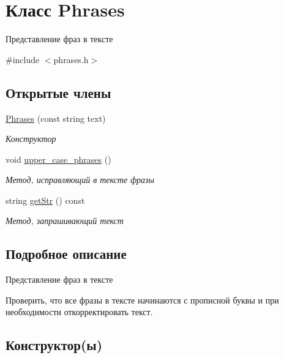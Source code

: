 \hypertarget{classPhrases}{}\section{Класс Phrases}
\label{classPhrases}


Представление фраз в тексте  




{\ttfamily \#include $<$phrases.\+h$>$}

\subsection*{Открытые члены}
\begin{DoxyCompactItemize}
\item 
\hyperlink{classPhrases_af87c3bec3733612dfb6afcef83495ccb}{Phrases} (const string text)
\begin{DoxyCompactList}\small\item\em Конструктор \end{DoxyCompactList}\item 
void \hyperlink{classPhrases_ad870102ac0cc2e26435e0000592cb6f9}{upper\+\_\+case\+\_\+phrases} ()
\begin{DoxyCompactList}\small\item\em Метод, исправляющий в тексте фразы \end{DoxyCompactList}\item 
string \hyperlink{classPhrases_a81f88cdd9e53a8591565a0fdb1890927}{get\+Str} () const 
\begin{DoxyCompactList}\small\item\em Метод, запрашивающий текст \end{DoxyCompactList}\end{DoxyCompactItemize}


\subsection{Подробное описание}
Представление фраз в тексте 

Проверить, что все фразы в тексте начинаются с прописной буквы и при необходимости откорректировать текст. 

\subsection{Конструктор(ы)}
\hypertarget{classPhrases_af87c3bec3733612dfb6afcef83495ccb}{}
